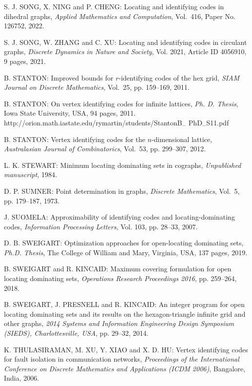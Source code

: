 \begin{thebibliography}{999}
S. J. SONG, X. NING and P. CHENG: Locating and identifying codes in dihedral graphs, {\it Applied Mathematics and Computation}, Vol.~416, Paper No. 126752, 2022.

S. J. SONG, W. ZHANG and C. XU: Locating and identifying codes in circulant graphs, {\it Discrete Dynamics in Nature and Society}, Vol. 2021, Article ID 4056910, 9 pages, 2021.

B. STANTON: Improved bounds for $r$-identifying codes of the hex grid, {\it SIAM Journal on Discrete Mathematics}, Vol.~25, pp. 159--169, 2011.

B. STANTON: On vertex identifying codes for infinite lattices, {\it Ph. D. Thesis}, Iowa State University, USA, 94 pages, 2011.\\
http://orion.math.iastate.edu/rymartin/students/StantonB$_{-}$ PhD$_{-}$S11.pdf

B. STANTON: Vertex identifying codes for the $n$-dimensional lattice, {\it Australasian Journal of Combinatorics}, Vol.~53, pp. 299--307, 2012.

L. K. STEWART: Minimum locating dominating sets in cographs, {\it Unpublished manuscript}, 1984.

 D. P. SUMNER: Point determination in graphs, {\it Discrete Mathematics}, Vol.~5, pp. 179--187, 1973.

J. SUOMELA: Approximability of identifying codes and locating-dominating codes, {\it Information Processing Letters}, Vol. 103, pp. 28--33, 2007.

D. B. SWEIGART: Optimization approaches for open-locating dominating sets, {\it Ph.D. Thesis}, The College of William and Mary, Virginia, USA, 137 pages, 2019.

B. SWEIGART and R. KINCAID: Maximum covering formulation for open locating dominating sets, {\it Operations Research Proceedings 2016}, pp. 259--264, 2018.

B. SWEIGART, J. PRESNELL and R. KINCAID: An integer program for open locating dominating sets and its results on the hexagon-triangle infinite grid and other graphs, {\it 2014 Systems and Information Engineering Design Symposium (SIEDS), Charlottesville, USA}, pp. 29--32, 2014.

K. THULASIRAMAN, M. XU, Y. XIAO and X. D. HU: Vertex identifying codes for fault isolation in communication networks, {\it Proceedings of the International Conference on Discrete Mathematics and Applications (ICDM 2006)}, Bangalore, India, 2006.


\end{thebibliography}
